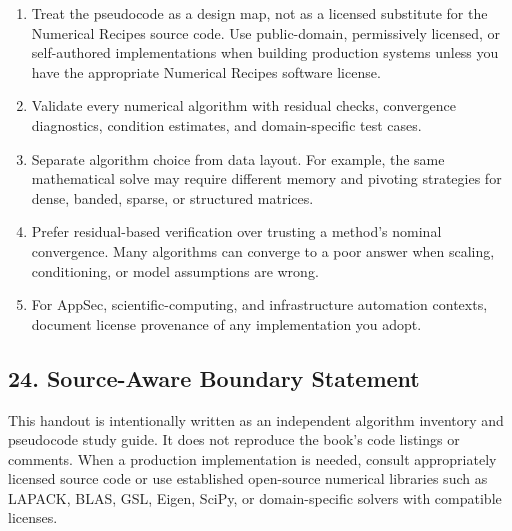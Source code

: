 \documentclass[11pt]{article}
\providecommand{\tightlist}{\setlength{\itemsep}{0pt}\setlength{\parskip}{0pt}}
\begin{document}
\begin{enumerate}
\def\labelenumi{\arabic{enumi}.}
\tightlist
\item
  Treat the pseudocode as a design map, not as a licensed substitute for the Numerical Recipes source code. Use public-domain, permissively licensed, or self-authored implementations when building production systems unless you have the appropriate Numerical Recipes software license.
\item
  Validate every numerical algorithm with residual checks, convergence diagnostics, condition estimates, and domain-specific test cases.
\item
  Separate algorithm choice from data layout. For example, the same mathematical solve may require different memory and pivoting strategies for dense, banded, sparse, or structured matrices.
\item
  Prefer residual-based verification over trusting a method's nominal convergence. Many algorithms can converge to a poor answer when scaling, conditioning, or model assumptions are wrong.
\item
  For AppSec, scientific-computing, and infrastructure automation contexts, document license provenance of any implementation you adopt.
\end{enumerate}

\subsection{24. Source-Aware Boundary Statement}\label{source-aware-boundary-statement}

This handout is intentionally written as an independent algorithm inventory and pseudocode study guide. It does not reproduce the book's code listings or comments. When a production implementation is needed, consult appropriately licensed source code or use established open-source numerical libraries such as LAPACK, BLAS, GSL, Eigen, SciPy, or domain-specific solvers with compatible licenses.
\end{document}
